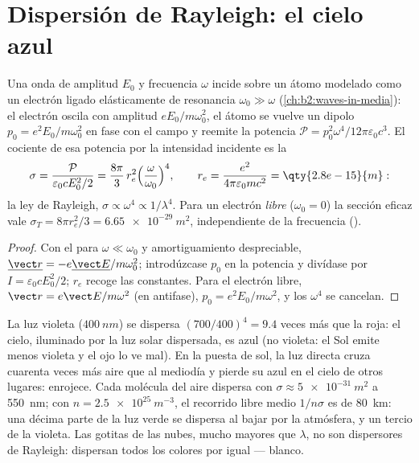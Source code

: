 \section{Dispersión de Rayleigh: el cielo azul}

\begin{proposition}\label{prop:b2:dipole-radiation:rayleigh}
Una onda de amplitud $E_0$ y frecuencia $\omega$ incide sobre un átomo modelado
como un electrón ligado elásticamente de resonancia $\omega_0 \gg \omega$
(\cref{ch:b2:waves-in-media}): el electrón oscila con amplitud
$eE_0/m\omega_0^2$, el átomo se vuelve un dipolo $p_0 = e^2E_0/m\omega_0^2$ en fase
con el campo y reemite la potencia $\mathcal P = p_0^2\omega^4/12\pi
\varepsilon_0c^3$. El cociente de esa potencia por la intensidad incidente es la
\emph{}
\[
\sigma = \frac{\mathcal P}{\varepsilon_0cE_0^2/2} = \frac{8\pi}3\,r_e^2\Bigl(\frac\omega{\omega_0}\Bigr)^4 ,
\qquad r_e = \frac{e^2}{4\pi\varepsilon_0mc^2} = \qty{2.8e-15}{m} :
\]
la ley de Rayleigh, $\sigma \propto \omega^4 \propto 1/\lambda^4$. Para un electrón
\emph{libre} ($\omega_0 = 0$) la sección eficaz vale $\sigma_T = 8\pi r_e^2/3 =
\qty{6.65e-29}{m^2}$, independiente de la frecuencia ().
\end{proposition}

\begin{proof}
Con el  para $\omega \ll \omega_0$ y amortiguamiento despreciable,
$\underline{\vect r} = -e\underline{\vect E}/m\omega_0^2$; introdúzcase $p_0$ en la potencia y
divídase por $I = \varepsilon_0cE_0^2/2$; $r_e$ recoge las constantes. Para el electrón
libre, $\vect r = e\vect E/m\omega^2$ (en antifase), $p_0 = e^2E_0/m\omega^2$, y
los $\omega^4$ se cancelan.
\end{proof}

\begin{example}\label{ex:b2:dipole-radiation:sky}
La luz violeta ($\qty{400}{nm}$) se dispersa $(700/400)^4 = 9.4$ veces más
que la roja: el cielo, iluminado por la luz solar dispersada, es azul (no
violeta: el Sol emite menos violeta y el ojo lo ve mal). En la puesta de sol, la luz
directa cruza cuarenta veces más aire que al mediodía y pierde su azul en
el cielo de otros lugares: enrojece. Cada molécula del aire dispersa con
$\sigma \approx \qty{5e-31}{m^2}$ a \qty{550}{nm}; con $n = \qty{2.5e25}{m^{-3}}$, el
recorrido libre medio $1/n\sigma$ es de \qty{80}{km}: una décima parte de la luz verde se
dispersa al bajar por la atmósfera, y un tercio de la
violeta. Las gotitas de las nubes, mucho mayores que $\lambda$, no son dispersores
de Rayleigh: dispersan todos los colores por igual --- blanco.
\end{example}

